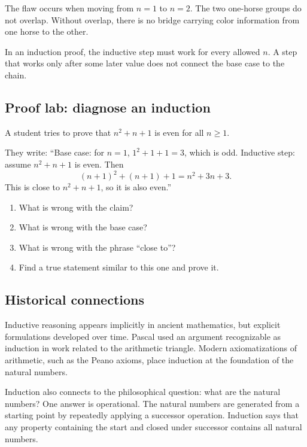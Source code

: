 The flaw occurs when moving from $n=1$ to $n=2$. The two one-horse groups do not overlap. Without overlap, there is no bridge carrying color information from one horse to the other.

\begin{trapbox}
In an induction proof, the inductive step must work for every allowed $n$. A step that works only after some later value does not connect the base case to the chain.
\end{trapbox}

\subsection{Proof lab: diagnose an induction}

\begin{labbox}
A student tries to prove that $n^2+n+1$ is even for all $n\geq1$.

They write: ``Base case: for $n=1$, $1^2+1+1=3$, which is odd. Inductive step: assume $n^2+n+1$ is even. Then
\[
(n+1)^2+(n+1)+1=n^2+3n+3.
\]
This is close to $n^2+n+1$, so it is also even.''

\begin{enumerate}
\item What is wrong with the claim?
\item What is wrong with the base case?
\item What is wrong with the phrase ``close to''?
\item Find a true statement similar to this one and prove it.
\end{enumerate}
\end{labbox}

\subsection{Historical connections}

\begin{historybox}
Inductive reasoning appears implicitly in ancient mathematics, but explicit formulations developed over time. Pascal used an argument recognizable as induction in work related to the arithmetic triangle. Modern axiomatizations of arithmetic, such as the Peano axioms, place induction at the foundation of the natural numbers.
\end{historybox}

Induction also connects to the philosophical question: what are the natural numbers? One answer is operational. The natural numbers are generated from a starting point by repeatedly applying a successor operation. Induction says that any property containing the start and closed under successor contains all natural numbers.

